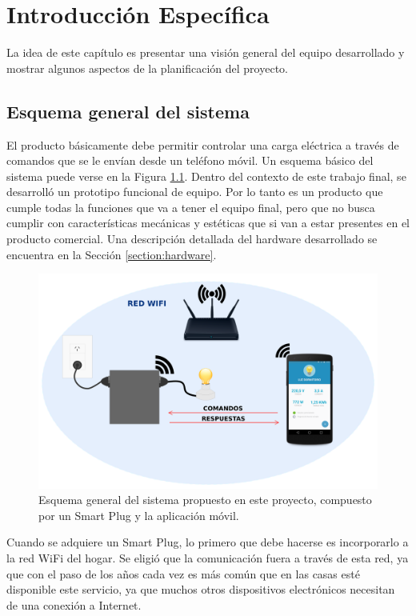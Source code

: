 \chapter{Introducción Específica} %

\label{Chapter2}

La idea de este capítulo es presentar una visión general del equipo desarrollado y mostrar algunos aspectos de la planificación del proyecto.


\section{Esquema general del sistema}

El producto básicamente debe permitir controlar una carga eléctrica a través de comandos que se le envían desde un teléfono móvil. Un esquema básico del sistema puede verse en la Figura \ref{fig:esquema_sistema}. Dentro del contexto de este trabajo final, se desarrolló un prototipo funcional de equipo. Por lo tanto es un producto que cumple todas la funciones que va a tener el equipo final, pero que no busca cumplir con características mecánicas y estéticas que si van a estar presentes en el producto comercial. Una descripción detallada del hardware desarrollado se encuentra en la Sección \ref{section:hardware}.

\begin{figure}[h]
	\centering
	\includegraphics[width=12cm]{./Figures/2_1_esquema_sistema.png}
	\caption{Esquema general del sistema propuesto en este proyecto, compuesto por un Smart Plug y la aplicación móvil.}
	\label{fig:esquema_sistema}
\end{figure}

Cuando se adquiere un Smart Plug, lo primero que debe hacerse es incorporarlo a la red WiFi del hogar. Se eligió que la comunicación fuera a través de esta red, ya que con el paso de los años cada vez es más común que en las casas esté disponible este servicio, ya que muchos otros dispositivos electrónicos necesitan de una conexión a Internet.

